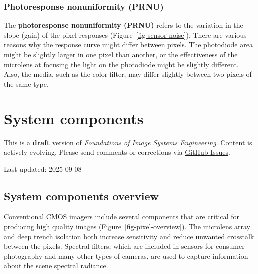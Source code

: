 \documentclass[
  letterpaper,
]{book}
\begin{document}
\subsection{Photoresponse nonuniformity
(PRNU)}\label{sec-photoresponse-nonuniformity}

The \textbf{photoresponse nonuniformity (PRNU)} refers to the variation
in the slope (gain) of the pixel responses
(Figure~\ref{fig-sensor-noise}). There are various reasons why the
response curve might differ between pixels. The photodiode area might be
slightly larger in one pixel than another, or the effectiveness of the
microlens at focusing the light on the photodiode might be slightly
different. Also, the media, such as the color filter, may differ
slightly between two pixels of the same type.

\chapter{System components}\label{sec-sensor-components}

\begin{tcolorbox}[enhanced jigsaw, colframe=quarto-callout-warning-color-frame, titlerule=0mm, rightrule=.15mm, opacitybacktitle=0.6, colback=white, leftrule=.75mm, coltitle=black, title=\textcolor{quarto-callout-warning-color}{\faExclamationTriangle}\hspace{0.5em}{Work in Progress}, bottomrule=.15mm, colbacktitle=quarto-callout-warning-color!10!white, breakable, left=2mm, bottomtitle=1mm, toptitle=1mm, opacityback=0, arc=.35mm, toprule=.15mm]

This is a \textbf{draft} version of \emph{Foundations of Image Systems
Engineering}. Content is actively evolving. Please send comments or
corrections via \href{https://github.com/wandell/FISE-git/issues}{GitHub
Issues}.

Last updated: 2025-09-08

\end{tcolorbox}

\section{System components
overview}\label{sec-sensor-components-overview}

Conventional CMOS imagers include several components that are critical
for producing high quality images (Figure~\ref{fig-pixel-overview}). The
microlens array and deep trench isolation both increase sensitivity and
reduce unwanted crosstalk between the pixels. Spectral filters, which
are included in sensors for consumer photography and many other types of
cameras, are used to capture information about the scene spectral
radiance.
\end{document}
